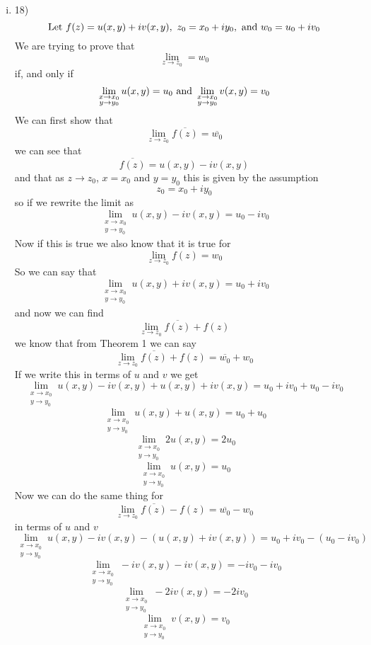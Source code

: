 \documentclass[11pt]{article}
\newcommand{\Let}{\textnormal{Let }}
\begin{document}
\begin{enumerate}
\begin{enumerate}[(i)]
\item 18)\\
$$\Let f(z) = u(x,y) + iv(x,y),\ z_0=x_0+iy_0,\ \textnormal{and } w_0 = u_0 +iv_0$$
We are trying to prove that
$$\lim_{z\rightarrow z_0} = w_0$$
if, and only if
$$\lim_{\substack{x\rightarrow x_0\\y\rightarrow y_0}} u(x,y) = u_0\ \textnormal{and } \lim_{\substack{x\rightarrow x_0\\y\rightarrow y_0}} v(x,y) = v_0$$
We can first show that 
$$\lim_{z\rightarrow z_0}\overline{f(z)} = \overline{w_0}$$
we can see that
$$\overline{f(z)} = u(x,y)-iv(x,y)$$
and that as $z\rightarrow z_0$, $x=x_0$ and $y=y_0$ this is given by the assumption 
$$z_0 = x_0 +iy_0$$
so if we rewrite the limit as
$$\lim_{\substack{x\rightarrow x_0\\y\rightarrow y_0}} u(x,y)-iv(x,y) = u_0-iv_0$$
Now if this is true we also know that it is true for 
$$\lim_{z\rightarrow z_0}{f(z)} = {w_0}$$
So we can say that 
$$\lim_{\substack{x\rightarrow x_0\\y\rightarrow y_0}} u(x,y)+iv(x,y) = u_0+iv_0$$
and now we can find
$$\lim_{z\rightarrow z_0}\overline{f(z)}+f(z)$$
we know that from Theorem 1 we can say
$$\lim_{z\rightarrow z_0}\overline{f(z)}+f(z) = \overline{w_0} +w_0$$
If we write this in terms of $u$ and $v$ we get
$$\lim_{\substack{x\rightarrow x_0\\y\rightarrow y_0}} u(x,y)-iv(x,y) + u(x,y)+iv(x,y) = u_0+iv_0+u_0-iv_0$$
$$\lim_{\substack{x\rightarrow x_0\\y\rightarrow y_0}} u(x,y) + u(x,y) = u_0+u_0$$
$$\lim_{\substack{x\rightarrow x_0\\y\rightarrow y_0}}2u(x,y) =2u_0$$
$$\lim_{\substack{x\rightarrow x_0\\y\rightarrow y_0}}u(x,y) =u_0$$
Now we can do the same thing for
$$\lim_{z\rightarrow z_0}\overline{f(z)}-f(z) = \overline{w_0} -w_0$$
in terms of $u$ and $v$
$$\lim_{\substack{x\rightarrow x_0\\y\rightarrow y_0}} u(x,y)-iv(x,y) - (u(x,y)+iv(x,y)) = u_0+iv_0-(u_0-iv_0)$$
$$\lim_{\substack{x\rightarrow x_0\\y\rightarrow y_0}} -iv(x,y) - iv(x,y) = -iv_0-iv_0$$
$$\lim_{\substack{x\rightarrow x_0\\y\rightarrow y_0}} -2iv(x,y) = -2iv_0$$
$$\lim_{\substack{x\rightarrow x_0\\y\rightarrow y_0}} v(x,y) = v_0$$


\end{enumerate}
\end{enumerate}
\end{document}
